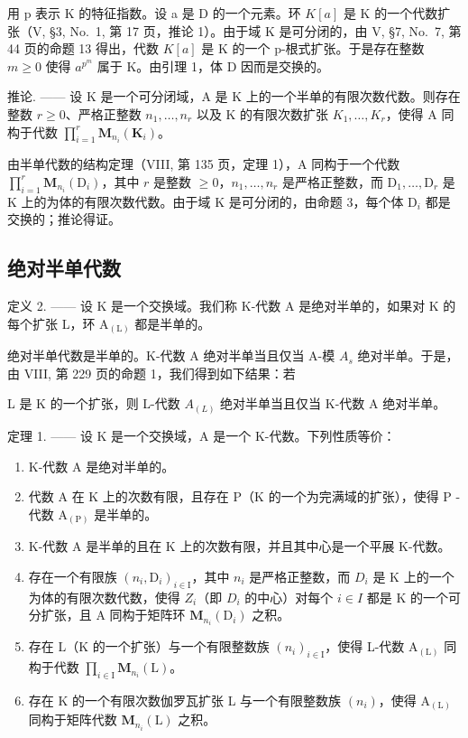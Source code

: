 用 p 表示 K 的特征指数。设 a 是 D 的一个元素。环 \(K[a]\) 是 K 的一个代数扩张（V, §3, No.~1, 第 17 页，推论 1）。由于域 K 是可分闭的，由 V, §7, No.~7, 第 44 页的命题 13 得出，代数 \(K[a]\) 是 K 的一个 p-根式扩张。于是存在整数 \(m \geqslant 0\) 使得 \(a^{p^{m}}\) 属于 K。由引理 1，体 D 因而是交换的。

推论. —— 设 K 是一个可分闭域，A 是 K 上的一个半单的有限次数代数。则存在整数 \(r \geqslant 0\)、严格正整数 \(n_{1}, \ldots, n_{r}\) 以及 K 的有限次数扩张 \(K_{1}, \ldots, K_{r}\)，使得 A 同构于代数 \(\prod_{i=1}^{r} \mathbf{M}_{n_{i}}(\mathbf{K}_{i})\)。

由半单代数的结构定理（VIII, 第 135 页，定理 1），A 同构于一个代数 \(\prod_{i=1}^{r} \mathbf{M}_{n_i}(\mathrm{D}_i)\)，其中 \(r\) 是整数 \(\geqslant 0\)，\(n_1, \ldots, n_r\) 是严格正整数，而 \(\mathrm{D}_1, \ldots, \mathrm{D}_r\) 是 K 上的为体的有限次数代数。由于域 K 是可分闭的，由命题 3，每个体 \(\mathrm{D}_i\) 都是交换的；推论得证。

\subsection{绝对半单代数}

定义 2. —— 设 K 是一个交换域。我们称 K-代数 A 是绝对半单的，如果对 K 的每个扩张 L，环 \(\mathrm{A}_{(\mathrm{L})}\) 都是半单的。

绝对半单代数是半单的。K-代数 A 绝对半单当且仅当 A-模 \(A_{s}\) 绝对半单。于是，由 VIII, 第 229 页的命题 1，我们得到如下结果：若

L 是 K 的一个扩张，则 L-代数 \(A_{(L)}\) 绝对半单当且仅当 K-代数 A 绝对半单。

定理 1. —— 设 K 是一个交换域，A 是一个 K-代数。下列性质等价：

\begin{enumerate}
\def\labelenumi{(\roman{enumi})}
\item
  K-代数 A 是绝对半单的。
\item
  代数 \(\mathrm{A}\) 在 \(\mathrm{K}\) 上的次数有限，且存在 \(\mathrm{P}\)（\(\mathrm{K}\) 的一个为完满域的扩张），使得 \(\mathrm{P}\) -代数 \(\mathrm{A}_{(\mathrm{P})}\) 是半单的。
\item
  K-代数 A 是半单的且在 K 上的次数有限，并且其中心是一个平展 K-代数。
\item
  存在一个有限族 \((n_{i},\mathrm{D}_{i})_{i\in\mathrm{I}}\)，其中 \(n_{i}\) 是严格正整数，而 \(D_{i}\) 是 K 上的一个为体的有限次数代数，使得 \(Z_{i}\)（即 \(D_{i}\) 的中心）对每个 \(i\in I\) 都是 K 的一个可分扩张，且 A 同构于矩阵环 \(\mathbf{M}_{n_{i}}(\mathrm{D}_{i})\) 之积。
\item
  存在 \(\mathrm{L}\)（\(\mathrm{K}\) 的一个扩张）与一个有限整数族 \((n_i)_{i\in \mathrm{I}}\)，使得 L-代数 \(\mathrm{A}_{(\mathrm{L})}\) 同构于代数 \(\prod_{i\in \mathrm{I}}\mathbf{M}_{n_i}(\mathrm{L})\)。
\item
  存在 K 的一个有限次数伽罗瓦扩张 L 与一个有限整数族 \((n_{i})\)，使得 \(\mathrm{A}_{(\mathrm{L})}\) 同构于矩阵代数 \(\mathbf{M}_{n_{i}}(\mathrm{L})\) 之积。
\end{enumerate}

